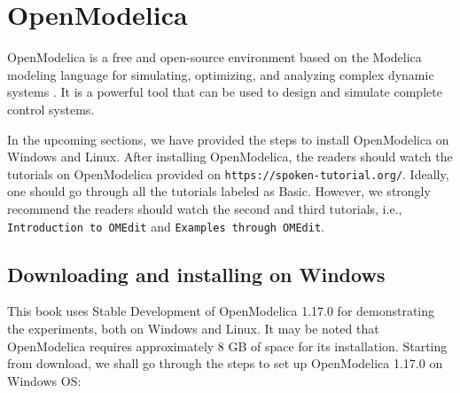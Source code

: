 \begin{juliacode}
      \label{julia:test-firmware}
      
\end{juliacode}






\section{OpenModelica}
\label{sec:OpenModelica-start}
OpenModelica is a free and open-source environment based on the Modelica modeling language 
for simulating, optimizing, and analyzing complex dynamic systems \cite{om-ref}.
It is a powerful tool that can be used to design and simulate complete control systems. 

In the upcoming sections, we have provided the steps to install OpenModelica on Windows and Linux. 
After installing OpenModelica, the readers should watch the tutorials on OpenModelica provided on 
{\tt https://spoken-tutorial.org/}. Ideally, one should go through all the tutorials labeled as Basic. 
However, we strongly recommend the readers should watch the second and third tutorials, i.e., 
{\tt Introduction to OMEdit} and {\tt Examples through OMEdit}.


\subsection{Downloading and installing on Windows} \label{openmodelica-install-windows}
This book uses Stable Development of OpenModelica 1.17.0 for demonstrating 
the experiments, both on Windows and Linux. It may be noted that 
OpenModelica requires approximately 8 GB of space for its installation. 
Starting from download, we shall go through the steps to set up OpenModelica 
1.17.0 on Windows OS:

